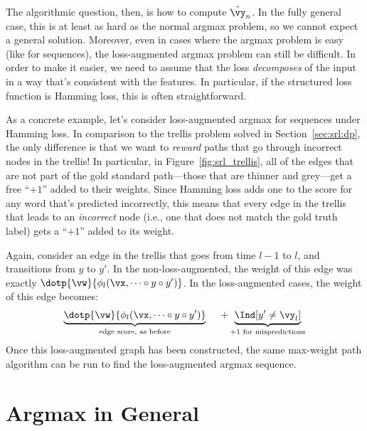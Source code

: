 The algorithmic question, then, is how to compute $\hat\vy_n$.
In the fully general case, this is at least as hard as the normal argmax problem, so we cannot expect a general solution.
Moreover, even in cases where the argmax problem is easy (like for sequences), the loss-augmented argmax problem can still be difficult.
In order to make it easier, we need to assume that the loss \emph{decomposes} of the input in a way that's consistent with the features.
In particular, if the structured loss function is Hamming loss, this is often straightforward.

As a concrete example, let's consider loss-augmented argmax for sequences under Hamming loss.
In comparison to the trellis problem solved in Section~\ref{sec:srl:dp}, the only difference is that we want to \emph{reward} paths that go through incorrect nodes in the trellis!
In particular, in Figure~\ref{fig:srl_trellis}, all of the edges that are not part of the gold standard path---those that are thinner and grey---get a free ``$+1$'' added to their weights.
Since Hamming loss adds one to the score for any word that's predicted incorrectly, this means that every edge in the trellis that leads to an \emph{incorrect} node (i.e., one that does not match the gold truth label) gets a ``$+1$'' added to its weight.

Again, consider an edge in the trellis that goes from time $l-1$ to $l$, and transitions from $y$ to $y'$.
In the non-loss-augmented, the weight of this edge
was exactly $\dotp{\vw}{\phi_l(\vx, \dots \circ y \circ y')}$.
In the loss-augmented cases, the weight of this edge becomes:
%
\begin{align}
  \underbrace{\dotp{\vw}{\phi_l(\vx, \dots \circ y \circ y')}}_{\text{edge score, as before}}
~~~~+ \underbrace{\Ind[y' \neq \vy_l]}_{+1 \text{ for mispredictions}}
\end{align}
%
Once this loss-augmented graph has been constructed, the same max-weight path algorithm can be run to find the loss-augmented argmax sequence.


\section{Argmax in General} \label{sec:srl:general}

